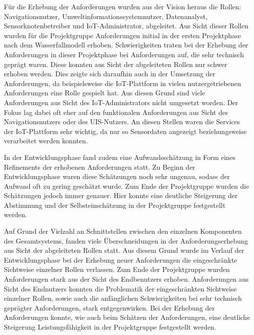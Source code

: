 Für die Erhebung der Anforderungen wurden aus der Vision heraus die Rollen: Navigationsnutzer, Umweltinformationssystemnutzer, Datenanalyst, Sensorknotenbetreiber und IoT-Administrator, abgeleitet. Aus Sicht dieser Rollen wurden für die Projektgruppe Anforderungen initial in der ersten Projektphase nach dem Wasserfallmodell erhoben. Schwierigkeiten traten bei der Erhebung der Anforderungen in dieser Projektphase bei Anforderungen auf, die sehr technisch geprägt waren. Diese konnten aus Sicht der abgeleiteten Rollen nur schwer erhoben werden.
Dies zeigte sich daraufhin auch in der Umsetzung der Anforderungen, da beispielsweise die IoT-Plattform in vielen nutzergetriebenen Anforderungen eine Rolle gespielt hat.
Aus diesen Grund sind viele Anforderungen aus Sicht des IoT-Administrators nicht umgesetzt worden.
Der Fokus lag dabei oft eher auf den funktionalen Anforderungen aus Sicht des Navigationsnutzers oder des UIS-Nutzers. 
An diesen Stellen waren die Services der IoT-Plattform sehr wichtig, da nur so Sensordaten angezeigt beziehungsweise verarbeitet werden konnten.\par\medskip
In der Entwicklungsphase fand zudem eine Aufwandsschätzung in Form eines Refinements der erhobenen Anforderungen statt. 
Zu Beginn der Entwicklungsphase waren diese Schätzungen noch sehr ungenau, sodass der Aufwand oft zu gering geschätzt wurde. Zum Ende der Projektgruppe wurden die Schätzungen jedoch immer genauer. Hier konnte eine deutliche Steigerung der Abstimmung und der Selbsteinschätzung in der Projektgruppe festgestellt werden.\par\medskip
Auf Grund der Vielzahl an Schnittstellen zwischen den einzelnen Komponenten des Gesamtsystems, fanden viele Überschneidungen in der Anforderungserhebung aus Sicht der abgeleiteten Rollen statt. 
Aus diesem Grund wurde im Verlauf der Entwicklungsphase bei der Erhebung neuer Anforderungen die eingeschränkte Sichtweise einzelner Rollen verlassen. 
Zum Ende der Projektgruppe wurden Anforderungen stark aus der Sicht des Endbenutzers erhoben.
Anforderungen aus Sicht des Endnutzers konnten die Problematik der eingeschränkten Sichtweise einzelner Rollen, sowie auch die anfänglichen Schwierigkeiten bei sehr technisch geprägter Anforderungen, stark entgegenwirken. 
Bei der Erhebung der Anforderungen konnte, wie auch beim Schätzen der Anforderungen, eine deutliche Steigerung Leistungsfähigkeit in der Projektgruppe festgestellt werden.\par\medskip
